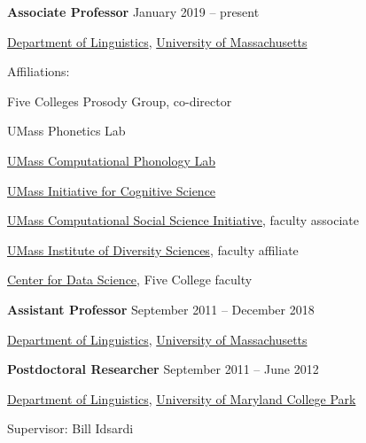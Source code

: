 \documentclass[10pt]{article}
\newcommand{\halfblankline}{\quad\vspace{-0.5\baselineskip}\pagebreak[3]}
\begin{document}
\textbf{Associate Professor} \hfill {January 2019 -- present}
\begin{innerlist}

    \item[] \href{http://www.umass.edu/linguist}{Department of Linguistics},
            \href{http://www.umass.edu/linguist}{University of Massachusetts}
    \begin{innerlist}
        \item Affiliations:
            \begin{innerlist}[\enskip$\circ$,leftmargin=*]
                \item {Five Colleges Prosody Group}, co-director
                \item {UMass Phonetics Lab}
                \item \href{https://blogs.umass.edu/comphon/}{UMass Computational Phonology Lab}
                \item \href{https://blogs.umass.edu/cogsci/}{UMass
                    Initiative for Cognitive Science}
                \item\href{http://www.cssi.umass.edu/}{UMass
                    Computational Social Science Initiative}, faculty associate
                \item\href{https://www.umass.edu/diversitysciences/}{UMass Institute of Diversity Sciences}, faculty affiliate
                \item\href{https://ds.cs.umass.edu/}{Center for Data
                  Science}, Five College faculty
            \end{innerlist}
    \end{innerlist}

\end{innerlist}

\halfblankline


\textbf{Assistant Professor} \hfill {September 2011 -- December 2018}
\begin{innerlist}

    \item[] \href{http://www.umass.edu/linguist}{Department of Linguistics},
            \href{http://www.umass.edu/linguist}{University of Massachusetts}
    \end{innerlist}

\halfblankline

\textbf{Postdoctoral Researcher} \hfill {September 2011 -- June 2012}
\begin{innerlist}

    \item[] \href{http://ling.umd.edu/}{Department of Linguistics},
            \href{http://www.umd.edu}{University of Maryland College
              Park}
            \begin{innerlist}
        \item Supervisor: Bill Idsardi
        \end{innerlist}

\end{innerlist}
\end{document}
